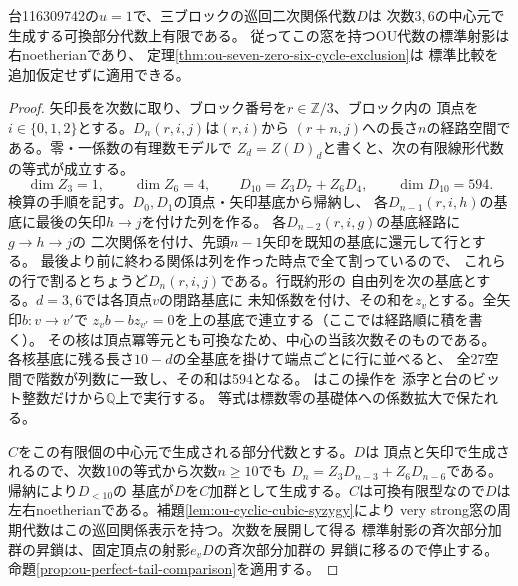 \begin{proposition}[七零の特殊点における中心上の有限性]
\label{prop:ou-seven-zero-finite-center}
台116309742の$u=1$で、三ブロックの巡回二次関係代数$D$は
次数$3,6$の中心元で生成する可換部分代数上有限である。
従ってこの窓を持つOU代数の標準射影は右noetherianであり、
定理\ref{thm:ou-seven-zero-six-cycle-exclusion}は
標準比較を追加仮定せずに適用できる。
\end{proposition}
\begin{proof}
矢印長を次数に取り、ブロック番号を$r\in\mathbb Z/3$、ブロック内の
頂点を$i\in\{0,1,2\}$とする。$D_n(r,i,j)$は$(r,i)$から
$(r+n,j)$への長さ$n$の経路空間である。零・一係数の有理数モデルで
$Z_d=Z(D)_d$と書くと、次の有限線形代数の等式が成立する。
\[
 \dim Z_3=1,\qquad \dim Z_6=4,\qquad
 D_{10}= Z_3D_7+ Z_6D_4,\qquad \dim D_{10}=594.
\]
検算の手順を記す。$D_0,D_1$の頂点・矢印基底から帰納し、
各$D_{n-1}(r,i,h)$の基底に最後の矢印$h\to j$を付けた列を作る。
各$D_{n-2}(r,i,g)$の基底経路に$g\to h\to j$の
二次関係を付け、先頭$n-1$矢印を既知の基底に還元して行とする。
最後より前に終わる関係は列を作った時点で全て割っているので、
これらの行で割るとちょうど$D_n(r,i,j)$である。行既約形の
自由列を次の基底とする。$d=3,6$では各頂点$v$の閉路基底に
未知係数を付け、その和を$z_v$とする。全矢印$b:v\to v'$で
$z_v b-bz_{v'}=0$を上の基底で連立する（ここでは経路順に積を書く）。
その核は頂点冪等元とも可換なため、中心の当該次数そのものである。
各核基底に残る長さ$10-d$の全基底を掛けて端点ごとに行に並べると、
全27空間で階数が列数に一致し、その和は594となる。
はこの操作を
添字と台のビット整数だけから$\mathbb Q$上で実行する。
等式は標数零の基礎体への係数拡大で保たれる。

$C$をこの有限個の中心元で生成される部分代数とする。$D$は
頂点と矢印で生成されるので、次数10の等式から次数$n\ge10$でも
$D_n=Z_3D_{n-3}+Z_6D_{n-6}$である。帰納により$D_{<10}$の
基底が$D$を$C$加群として生成する。$C$は可換有限型なので$D$は
左右noetherianである。補題\ref{lem:ou-cyclic-cubic-syzygy}により
very strong窓の周期代数はこの巡回関係表示を持つ。次数を展開して得る
標準射影の斉次部分加群の昇鎖は、固定頂点の射影$e_vD$の斉次部分加群の
昇鎖に移るので停止する。命題\ref{prop:ou-perfect-tail-comparison}を適用する。
\end{proof}

